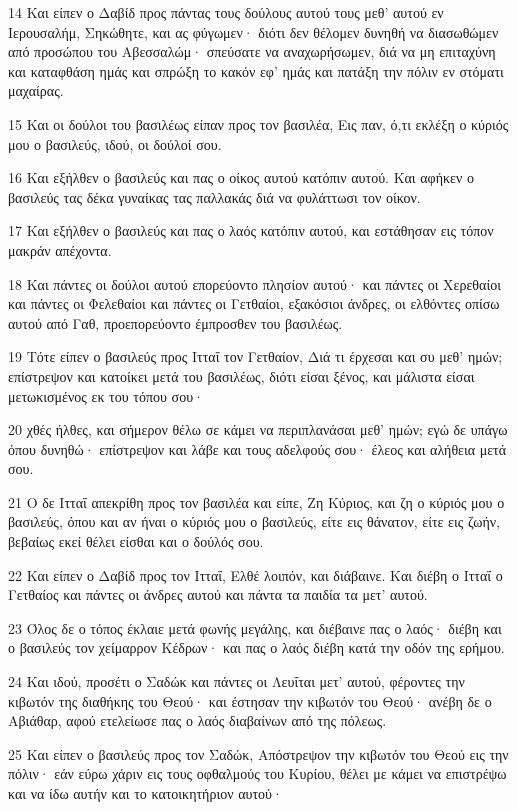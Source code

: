 \par 14 Και είπεν ο Δαβίδ προς πάντας τους δούλους αυτού τους μεθ' αυτού εν Ιερουσαλήμ, Σηκώθητε, και ας φύγωμεν· διότι δεν θέλομεν δυνηθή να διασωθώμεν από προσώπου του Αβεσσαλώμ· σπεύσατε να αναχωρήσωμεν, διά να μη επιταχύνη και καταφθάση ημάς και σπρώξη το κακόν εφ' ημάς και πατάξη την πόλιν εν στόματι μαχαίρας.
\par 15 Και οι δούλοι του βασιλέως είπαν προς τον βασιλέα, Εις παν, ό,τι εκλέξη ο κύριός μου ο βασιλεύς, ιδού, οι δούλοί σου.
\par 16 Και εξήλθεν ο βασιλεύς και πας ο οίκος αυτού κατόπιν αυτού. Και αφήκεν ο βασιλεύς τας δέκα γυναίκας τας παλλακάς διά να φυλάττωσι τον οίκον.
\par 17 Και εξήλθεν ο βασιλεύς και πας ο λαός κατόπιν αυτού, και εστάθησαν εις τόπον μακράν απέχοντα.
\par 18 Και πάντες οι δούλοι αυτού επορεύοντο πλησίον αυτού· και πάντες οι Χερεθαίοι και πάντες οι Φελεθαίοι και πάντες οι Γετθαίοι, εξακόσιοι άνδρες, οι ελθόντες οπίσω αυτού από Γαθ, προεπορεύοντο έμπροσθεν του βασιλέως.
\par 19 Τότε είπεν ο βασιλεύς προς Ιτταΐ τον Γετθαίον, Διά τι έρχεσαι και συ μεθ' ημών; επίστρεψον και κατοίκει μετά του βασιλέως, διότι είσαι ξένος, και μάλιστα είσαι μετωκισμένος εκ του τόπου σου·
\par 20 χθές ήλθες, και σήμερον θέλω σε κάμει να περιπλανάσαι μεθ' ημών; εγώ δε υπάγω όπου δυνηθώ· επίστρεψον και λάβε και τους αδελφούς σου· έλεος και αλήθεια μετά σου.
\par 21 Ο δε Ιτταΐ απεκρίθη προς τον βασιλέα και είπε, Ζη Κύριος, και ζη ο κύριός μου ο βασιλεύς, όπου και αν ήναι ο κύριός μου ο βασιλεύς, είτε εις θάνατον, είτε εις ζωήν, βεβαίως εκεί θέλει είσθαι και ο δούλός σου.
\par 22 Και είπεν ο Δαβίδ προς τον Ιτταΐ, Ελθέ λοιπόν, και διάβαινε. Και διέβη ο Ιτταΐ ο Γετθαίος και πάντες οι άνδρες αυτού και πάντα τα παιδία τα μετ' αυτού.
\par 23 Όλος δε ο τόπος έκλαιε μετά φωνής μεγάλης, και διέβαινε πας ο λαός· διέβη και ο βασιλεύς τον χείμαρρον Κέδρων· και πας ο λαός διέβη κατά την οδόν της ερήμου.
\par 24 Και ιδού, προσέτι ο Σαδώκ και πάντες οι Λευΐται μετ' αυτού, φέροντες την κιβωτόν της διαθήκης του Θεού· και έστησαν την κιβωτόν του Θεού· ανέβη δε ο Αβιάθαρ, αφού ετελείωσε πας ο λαός διαβαίνων από της πόλεως.
\par 25 Και είπεν ο βασιλεύς προς τον Σαδώκ, Απόστρεψον την κιβωτόν του Θεού εις την πόλιν· εάν εύρω χάριν εις τους οφθαλμούς του Κυρίου, θέλει με κάμει να επιστρέψω και να ίδω αυτήν και το κατοικητήριον αυτού·
